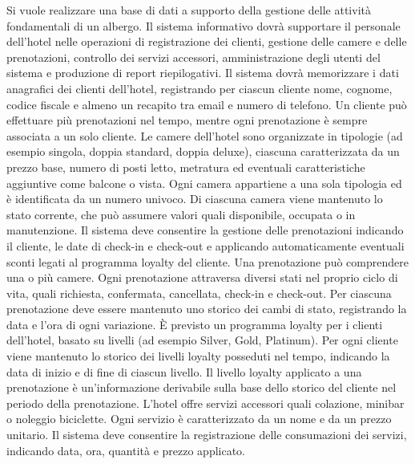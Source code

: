 \documentclass[a4paper,12pt]{report}
\begin{document}
Si vuole realizzare una base di dati a supporto della gestione delle attività fondamentali di un albergo.
\medskip
\newline
Il sistema informativo dovrà supportare il personale dell’hotel nelle operazioni di registrazione dei clienti, gestione delle camere e delle prenotazioni, controllo dei servizi accessori, amministrazione degli utenti del sistema e produzione di report riepilogativi.
\medskip
\newline
Il sistema dovrà memorizzare i dati anagrafici dei clienti dell’hotel, registrando per ciascun cliente nome, cognome, codice fiscale e almeno un recapito tra email e numero di telefono.
Un cliente può effettuare più prenotazioni nel tempo, mentre ogni prenotazione è sempre associata a un solo cliente.
\medskip
\newline
Le camere dell’hotel sono organizzate in tipologie (ad esempio singola, doppia standard, doppia deluxe), ciascuna caratterizzata da un prezzo base, numero di posti letto, metratura ed eventuali caratteristiche aggiuntive come balcone o vista.
Ogni camera appartiene a una sola tipologia ed è identificata da un numero univoco.
Di ciascuna camera viene mantenuto lo stato corrente, che può assumere valori quali disponibile, occupata o in manutenzione.
\medskip
\newline
Il sistema deve consentire la gestione delle prenotazioni indicando il cliente, le date di check-in e check-out e applicando automaticamente eventuali sconti legati al programma loyalty del cliente.
Una prenotazione può comprendere una o più camere.
Ogni prenotazione attraversa diversi stati nel proprio ciclo di vita, quali richiesta, confermata, cancellata, check-in e check-out.
Per ciascuna prenotazione deve essere mantenuto uno storico dei cambi di stato, registrando la data e l’ora di ogni variazione.
\medskip
\newline
È previsto un programma loyalty per i clienti dell’hotel, basato su livelli (ad esempio Silver, Gold, Platinum).
Per ogni cliente viene mantenuto lo storico dei livelli loyalty posseduti nel tempo, indicando la data di inizio e di fine di ciascun livello.
Il livello loyalty applicato a una prenotazione è un’informazione derivabile sulla base dello storico del cliente nel periodo della prenotazione.
\medskip
\newline
L’hotel offre servizi accessori quali colazione, minibar o noleggio biciclette.
Ogni servizio è caratterizzato da un nome e da un prezzo unitario.
Il sistema deve consentire la registrazione delle consumazioni dei servizi, indicando data, ora, quantità e prezzo applicato.
\end{document}
